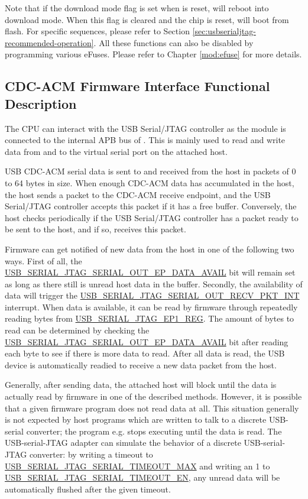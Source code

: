 \documentclass[main\_\_EN.tex]{subfiles}
\begin{document}
Note that if the download mode flag is set when \chipname{} is reset, \chipname{} will reboot into download mode. When this flag is cleared and the chip is reset, \chipname{} will boot from flash. For specific sequences, please refer to Section \ref{sec:usbserialjtag-recommended-operation}. All these functions can also be disabled by programming various eFuses. Please refer to Chapter \ref{mod:efuse} \textit{} for more details.

\subsection{CDC-ACM Firmware Interface Functional Description}

The CPU can interact with the USB Serial/JTAG controller as the module is connected to the internal APB bus of \chipname{}. This is mainly used to read and write data from and to the virtual serial port on the attached host.

USB CDC-ACM serial data is sent to and received from the host in packets of 0 to 64 bytes in size. When enough CDC-ACM data has accumulated in the host, the host sends a packet to the CDC-ACM receive endpoint, and the USB Serial/JTAG controller accepts this packet if it has a free buffer. Conversely, the host checks periodically if the USB Serial/JTAG controller has a packet ready to be sent to the host, and if so, receives this packet.

Firmware can get notified of new data from the host in one of the following two ways. First of all, the \\\hyperref[fielddesc:USBSERIALJTAGSERIALOUTEPDATAAVAIL]{USB\_SERIAL\_JTAG\_SERIAL\_OUT\_EP\_DATA\_AVAIL}  bit will remain set as long as there still is unread host data in the buffer. Secondly, the availability of data will trigger the  \hyperref[fielddesc:USBSERIALJTAGSERIALOUTRECVPKTINTRAW]{USB\_SERIAL\_JTAG\_SERIAL\_OUT\_RECV\_PKT\_INT} interrupt. When data is available, it can be read by firmware through repeatedly reading bytes from \hyperref[fielddesc:USBSERIALJTAGRDWRBYTE]{USB\_SERIAL\_JTAG\_EP1\_REG}. The amount of bytes to read can be determined by checking the \hyperref[fielddesc:USBSERIALJTAGSERIALOUTEPDATAAVAIL]{USB\_SERIAL\_JTAG\_SERIAL\_OUT\_EP\_DATA\_AVAIL} bit after reading each byte to see if there is more data to read. After all data is read, the USB device is automatically readied to receive a new data packet from the host.

Generally, after sending data, the attached host will block until the data is actually read by firmware in one of the described methods. However, it is possible that a given firmware program does not read data at all. This situation generally is not expected by host programs which are written to talk to a discrete USB-serial converter; the program e.g. stops executing until the data is read. The \chipname{} USB-serial-JTAG adapter can simulate the behavior of a discrete USB-serial-JTAG converter: by writing a timeout to \hyperref[fielddesc:USBSERIALJTAGSERIALTIMEOUTMAX]{USB\_SERIAL\_JTAG\_SERIAL\_TIMEOUT\_MAX} and writing an 1 to \hyperref[fielddesc:USBSERIALJTAGSERIALTIMEOUTEN]{USB\_SERIAL\_JTAG\_SERIAL\_TIMEOUT\_EN}, any unread data will be automatically flushed after the given timeout.
\end{document}
